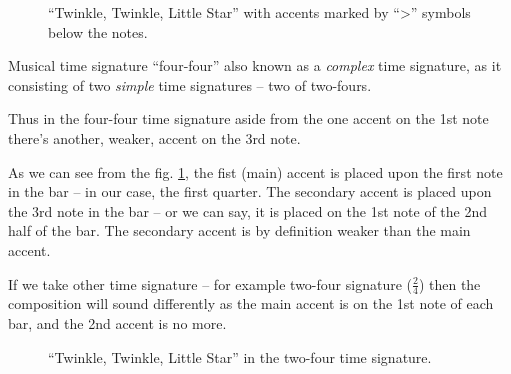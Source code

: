 \documentclass[../sparc.tex]{subfiles}
\begin{document}
\begin{figure}[ht]
  \centering
  \caption{``Twinkle, Twinkle, Little Star'' with accents marked by ``>''
    symbols below the notes.}
  \label{fig:lilypond-musical-scale-example-2}
\end{figure}

Musical time signature ``four-four'' also known as a \emph{complex} time
signature, as it consisting of two \emph{simple} time signatures -- two of
two-fours.

Thus in the four-four time signature aside from the one accent on the 1st note
there's another, weaker, accent on the 3rd note.

As we can see from the fig. \ref{fig:lilypond-musical-scale-example-2}, the fist
(main) accent is placed upon the first note in the bar -- in our case, the first
quarter.  The secondary accent is placed upon the 3rd note in the bar -- or we
can say, it is placed on the 1st note of the 2nd half of the bar.  The secondary
accent is by definition weaker than the main accent.

If we take other time signature -- for example two-four signature ($\frac{2}{4}$)
then the composition will sound differently as the main accent is on the 1st
note of each bar, and the 2nd accent is no more.

\begin{figure}[ht]
  \centering
  \caption{``Twinkle, Twinkle, Little Star'' in the two-four time signature.}
  \label{fig:lilypond-musical-scale-example-3}
\end{figure}
\end{document}
